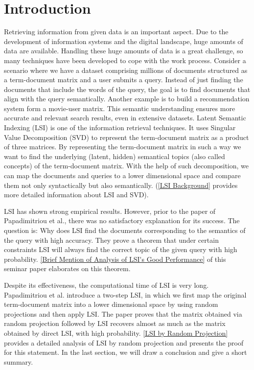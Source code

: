 \documentclass[a4paper,11pt,DIV=15]{scrartcl} %
\theoremstyle{plain}
\theoremstyle{definition}
\begin{document}
\clearpage


\section{Introduction} %
Retrieving information from given data is an important aspect.
Due to the development of information systems and the digital landscape, huge amounts of data are available. 
Handling these huge amounts of data is a great challenge, so many techniques have been developed to cope with the work process. 
Consider a scenario where we have a dataset comprising millions of documents structured as a term-document matrix and a user submits a query. Instead of just finding the documents that include the words of the query, the goal is to find documents that align with the query semantically. Another example is to build a recommendation system form a movie-user matrix.  %
This semantic understanding ensures more accurate and relevant search results, even in extensive datasets.
Latent Semantic Indexing (LSI) is one of the information retrieval techniques. It uses Singular Value Decomposition (SVD) to represent the term-document matrix as a product of three matrices. By representing the term-document matrix in such a way we want to find the underlying (latent, hidden) semantical topics (also called concepts) of the term-document matrix. With the help of such decomposition, we can map the documents and queries to a lower dimensional space and compare them not only syntactically but also semantically. (\cref{LSI Background} provides more detailed information about LSI and SVD).

LSI has shown strong empirical results. However, prior to the paper of Papadimitriou et al., there was no satisfactory explanation for its success. The question is: Why does LSI find the documents corresponding to the semantics of the query with high accuracy. They prove a theorem that under certain constraints LSI will always find the correct topic of the given query with high probability. \cref{Brief Mention of Analysis of LSI's Good Performance} of this seminar paper elaborates on this theorem.

Despite its effectiveness, the computational time of LSI is very long. Papadimitriou et al. introduce a two-step LSI, in which we first map the original term-document matrix into a lower dimensional space by using random projections and then apply LSI. The paper proves that the matrix obtained via random projection followed by LSI recovers almost as much as the matrix obtained by direct LSI, with high probability.  \cref{LSI by Random Projection} provides a detailed analysis of LSI by random projection and presents the proof for this statement.
In the last section, we will draw a conclusion and give a short summary.
\end{document}
